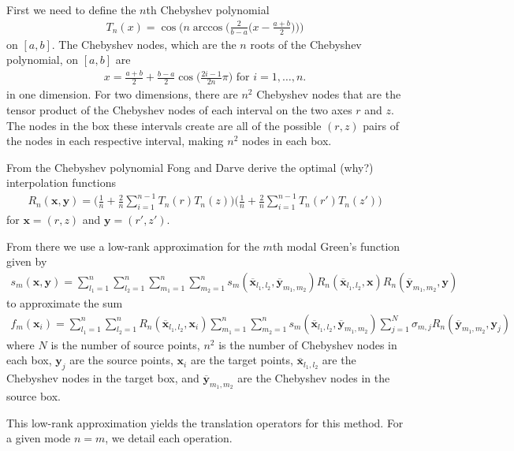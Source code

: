 \documentclass[11pt, oneside]{article}   	%
\begin{document}
First we need to define the $n$th Chebyshev polynomial
\begin{align}
T_n(x)=\cos\bigg(n\arccos\bigg(\frac{2}{b-a}\bigg(x-\frac{a+b}{2}\bigg)\bigg)\bigg)
\end{align}
on $[a,b]$. The Chebyshev nodes, which are the $n$ roots of the Chebyshev polynomial, on $[a,b]$ are
\begin{align}
x=\frac{a+b}{2}+\frac{b-a}{2}\cos\bigg(\frac{2i-1}{2n}\pi\bigg)\mbox{ for }i=1,\dots,n.
\end{align}
in one dimension. For two dimensions, there are $n^2$ Chebyshev nodes that are the tensor product of the Chebyshev nodes of each interval on the two axes $r$ and $z$. The nodes in the box these intervals create are all of the possible $(r,z)$ pairs of the nodes in each respective interval, making $n^2$ nodes in each box.

From the Chebyshev polynomial Fong and Darve derive the optimal (why?) interpolation functions
\begin{align}
R_n(\mathbf{x},\mathbf{y}) = \bigg(\frac{1}{n} + \frac{2}{n}\sum_{i=1}^{n-1}T_n(r)T_n(z)\bigg)\bigg(\frac{1}{n} + \frac{2}{n}\sum_{i=1}^{n-1}T_n(r')T_n(z')\bigg)
\end{align}
for $\mathbf{x}=(r,z)$ and $\mathbf{y}=(r',z')$.

From there we use a low-rank approximation for the $m$th modal Green's function given by
\begin{align}
s_m(\mathbf{x},\mathbf{y}) = \sum_{l_1=1}^n\sum_{l_2=1}^n\sum_{m_1=1}^n\sum_{m_2=1}^n s_m(\mathbf{\overline{x}}_{l_1,l_2},\mathbf{\overline{y}}_{m_1,m_2})R_n(\mathbf{\overline{x}}_{l_1,l_2},\mathbf{x})R_n(\mathbf{\overline{y}}_{m_1,m_2},\mathbf{y})
\end{align}
to approximate the sum
\begin{align}
f_m(\mathbf{x}_i)=\sum_{l_1=1}^n \sum_{l_2=1}^n R_n(\mathbf{\overline{x}}_{l_1,l_2},\mathbf{x}_i) \sum_{m_1=1}^n \sum_{m_2=1}^n s_m(\mathbf{\overline{x}}_{l_1,l_2},\mathbf{\overline{y}}_{m_1,m_2}) \sum_{j=1}^N \sigma_{m,j}R_n(\mathbf{\overline{y}}_{m_1,m_2},\mathbf{y}_j)
\end{align}
where $N$ is the number of source points, $n^2$ is the number of Chebyshev nodes in each box, $\mathbf{y}_j$ are the source points, $\mathbf{x}_i$ are the target points, $\mathbf{\overline{x}}_{l_1,l_2}$ are the Chebyshev nodes in the target box, and $\mathbf{\overline{y}}_{m_1,m_2}$ are the Chebyshev nodes in the source box.

This low-rank approximation yields the translation operators for this method. For a given mode $n=m$, we detail each operation.
\end{document}
